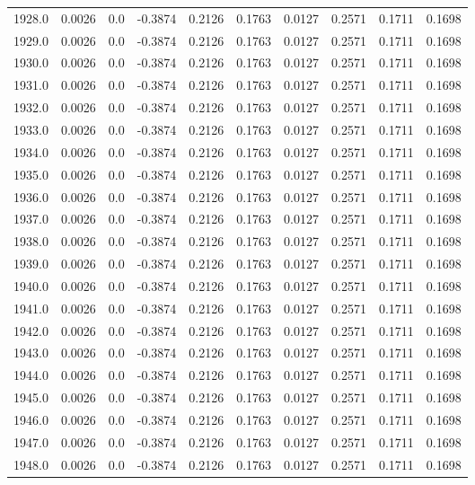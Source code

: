 \begin{longtable}{lrrrrrrrrr}
1928.0 & 0.0026 & 0.0 & -0.3874 & 0.2126 & 0.1763 & 0.0127 & 0.2571 & 0.1711 & 0.1698 \\
1929.0 & 0.0026 & 0.0 & -0.3874 & 0.2126 & 0.1763 & 0.0127 & 0.2571 & 0.1711 & 0.1698 \\
1930.0 & 0.0026 & 0.0 & -0.3874 & 0.2126 & 0.1763 & 0.0127 & 0.2571 & 0.1711 & 0.1698 \\
1931.0 & 0.0026 & 0.0 & -0.3874 & 0.2126 & 0.1763 & 0.0127 & 0.2571 & 0.1711 & 0.1698 \\
1932.0 & 0.0026 & 0.0 & -0.3874 & 0.2126 & 0.1763 & 0.0127 & 0.2571 & 0.1711 & 0.1698 \\
1933.0 & 0.0026 & 0.0 & -0.3874 & 0.2126 & 0.1763 & 0.0127 & 0.2571 & 0.1711 & 0.1698 \\
1934.0 & 0.0026 & 0.0 & -0.3874 & 0.2126 & 0.1763 & 0.0127 & 0.2571 & 0.1711 & 0.1698 \\
1935.0 & 0.0026 & 0.0 & -0.3874 & 0.2126 & 0.1763 & 0.0127 & 0.2571 & 0.1711 & 0.1698 \\
1936.0 & 0.0026 & 0.0 & -0.3874 & 0.2126 & 0.1763 & 0.0127 & 0.2571 & 0.1711 & 0.1698 \\
1937.0 & 0.0026 & 0.0 & -0.3874 & 0.2126 & 0.1763 & 0.0127 & 0.2571 & 0.1711 & 0.1698 \\
1938.0 & 0.0026 & 0.0 & -0.3874 & 0.2126 & 0.1763 & 0.0127 & 0.2571 & 0.1711 & 0.1698 \\
1939.0 & 0.0026 & 0.0 & -0.3874 & 0.2126 & 0.1763 & 0.0127 & 0.2571 & 0.1711 & 0.1698 \\
1940.0 & 0.0026 & 0.0 & -0.3874 & 0.2126 & 0.1763 & 0.0127 & 0.2571 & 0.1711 & 0.1698 \\
1941.0 & 0.0026 & 0.0 & -0.3874 & 0.2126 & 0.1763 & 0.0127 & 0.2571 & 0.1711 & 0.1698 \\
1942.0 & 0.0026 & 0.0 & -0.3874 & 0.2126 & 0.1763 & 0.0127 & 0.2571 & 0.1711 & 0.1698 \\
1943.0 & 0.0026 & 0.0 & -0.3874 & 0.2126 & 0.1763 & 0.0127 & 0.2571 & 0.1711 & 0.1698 \\
1944.0 & 0.0026 & 0.0 & -0.3874 & 0.2126 & 0.1763 & 0.0127 & 0.2571 & 0.1711 & 0.1698 \\
1945.0 & 0.0026 & 0.0 & -0.3874 & 0.2126 & 0.1763 & 0.0127 & 0.2571 & 0.1711 & 0.1698 \\
1946.0 & 0.0026 & 0.0 & -0.3874 & 0.2126 & 0.1763 & 0.0127 & 0.2571 & 0.1711 & 0.1698 \\
1947.0 & 0.0026 & 0.0 & -0.3874 & 0.2126 & 0.1763 & 0.0127 & 0.2571 & 0.1711 & 0.1698 \\
1948.0 & 0.0026 & 0.0 & -0.3874 & 0.2126 & 0.1763 & 0.0127 & 0.2571 & 0.1711 & 0.1698 \\

\end{longtable}
